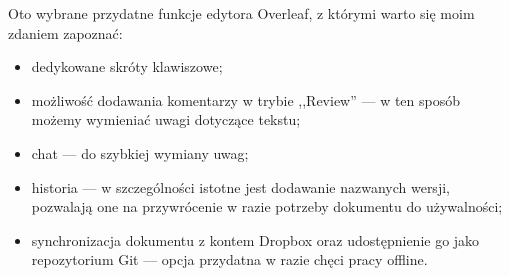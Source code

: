 Oto wybrane przydatne funkcje edytora Overleaf, z którymi warto się moim zdaniem zapoznać:
\begin{itemize}
    \item dedykowane skróty klawiszowe;
    \item możliwość dodawania komentarzy w trybie ,,Review'' --- w ten sposób możemy wymieniać uwagi dotyczące tekstu;
    \item chat --- do szybkiej wymiany uwag;
    \item historia --- w szczególności istotne jest dodawanie nazwanych wersji, pozwalają one na przywrócenie w razie potrzeby dokumentu do używalności;
    \item synchronizacja dokumentu z kontem Dropbox oraz udostępnienie go jako repozytorium Git --- opcja przydatna w razie chęci pracy offline.
\end{itemize}